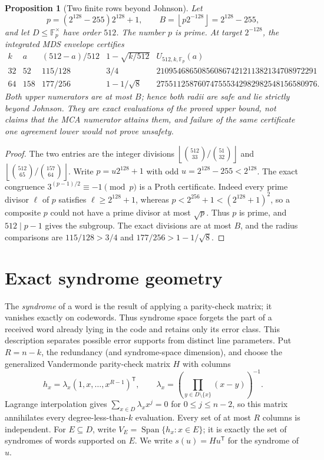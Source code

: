 \documentclass[11pt,a4paper]{amsart}
\numberwithin{equation}{section}
\newtheorem{proposition}[proposition]{Proposition}
\theoremstyle{remark}
\DeclareMathOperator{\Span}{Span}
\newcommand{\F}{\mathbb F}
\newcommand{\floor}[1]{\left\lfloor #1\right\rfloor}
\begin{document}
\begin{proposition}[Two finite rows beyond Johnson]
\label{prop:paving-finite-rows}
Let
\[
 p=(2^{128}-255)2^{128}+1,\qquad
 B=\floor{p2^{-128}}=2^{128}-255,
\]
and let \(D\le\F_p^\times\) have order \(512\).  The number \(p\) is
prime.  At target \(2^{-128}\), the integrated MDS envelope certifies
\[
\begin{array}{c|c|c|c|c}
 k&a&(512-a)/512&1-\sqrt{k/512}&U_{512,k,\F_p}(a)\\ \hline
 32&52&115/128&3/4&
 210954686508560867421211382134708972291\\
 64&158&177/256&1-1/\sqrt8&
 275511258760747555342982982548156580976 .
\end{array}                                       \tag{2.6}
 \label{eq:paving-finite-rows}
\]
Both upper numerators are at most \(B\); hence both radii are safe and
lie strictly beyond Johnson.  They are exact evaluations of the proved
upper bound, not claims that the MCA numerator attains them, and failure
of the same certificate one agreement lower would not prove unsafety.
\end{proposition}

\begin{proof}
The two entries are the integer divisions
\(\floor{\binom{512}{33}/\binom{51}{32}}\) and
\(\floor{\binom{512}{65}/\binom{157}{64}}\).
Write \(p=u2^{128}+1\) with odd \(u=2^{128}-255<2^{128}\).
The exact congruence
\(3^{(p-1)/2}\equiv-1\pmod p\) is a Proth certificate.  Indeed every
prime divisor \(\ell\) of \(p\) satisfies
\(\ell\ge2^{128}+1\), whereas
\(p<2^{256}+1<(2^{128}+1)^2\), so a composite \(p\) could not have a
prime divisor at most \(\sqrt p\).  Thus \(p\) is prime, and
\(512\mid p-1\) gives the subgroup.  The exact divisions are at most
\(B\), and the radius comparisons are
\(115/128>3/4\) and \(177/256>1-1/\sqrt8\).
\end{proof}

\section{Exact syndrome geometry}
\label{sec:syndrome-exact}

The \emph{syndrome} of a word is the result of applying a parity-check
matrix; it vanishes exactly on codewords.  Thus syndrome space forgets the
part of a received word already lying in the code and retains only its error
class.  This description separates possible error supports from distinct
line parameters.  Put \(R=n-k\), the redundancy (and syndrome-space
dimension), and choose the generalized Vandermonde parity-check matrix
\(H\) with columns
\[
 h_x=\lambda_x(1,x,\ldots,x^{R-1})^{\mathsf T},\qquad
 \lambda_x=\left(\prod_{y\in D\setminus\{x\}}(x-y)\right)^{-1}.
 \tag{3.1}\label{eq:parity-columns}
\]
Lagrange interpolation gives
\(\sum_{x\in D}\lambda_xx^j=0\) for \(0\le j\le n-2\), so this matrix
annihilates every degree-less-than-\(k\) evaluation.  Every set of at most
\(R\) columns is independent.  For \(E\subseteq D\), write
\(V_E=\Span\{h_x:x\in E\}\); it is exactly the set of syndromes of words
supported on \(E\).  We write \(s(u)=Hu^{\mathsf T}\) for the syndrome of
\(u\).
\end{document}
